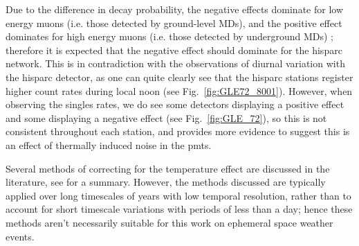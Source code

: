 Due to the difference in decay probability, the negative effects dominate for low energy muons (i.e. those detected by ground-level MDs), and the positive effect dominates for high energy muons (i.e. those detected by underground MDs) \citep{berkova_temperature_2011}; therefore it is expected that the negative effect should dominate for the \gls{hisparc} network. This is in contradiction with the observations of diurnal variation with the \gls{hisparc} detector, as one can quite clearly see that the \gls{hisparc} stations register higher count rates during local noon (see Fig.~\ref{fig:GLE72_8001}). However, when observing the singles rates, we do see some detectors displaying a positive effect and some displaying a negative effect (see Fig.~\ref{fig:GLE_72}), so this is not consistent throughout each station, and provides more evidence to suggest this is an effect of thermally induced noise in the \glspl{pmt}. %


Several methods of correcting for the temperature effect are discussed in the literature, see \cite{berkova_temperature_2011, mendoncca_temperature_2016} for a summary. However, the methods discussed are typically applied over long timescales of years with low temporal resolution, rather than to account for short timescale variations with periods of less than a day; hence these methods aren't necessarily suitable for this work on ephemeral space weather events.


